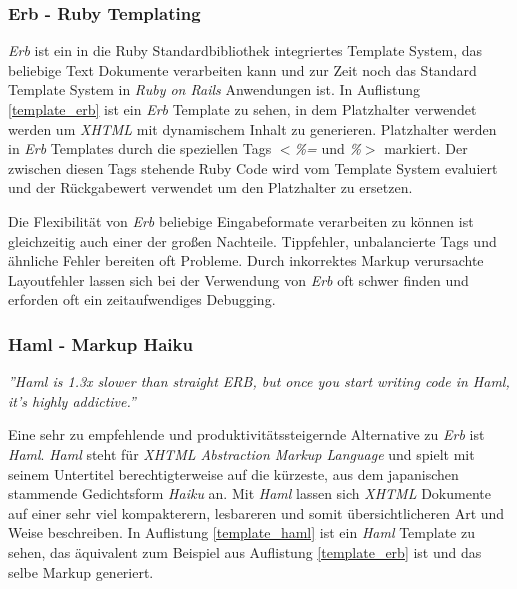 \subsubsection{Erb - Ruby Templating}

\textit{Erb} ist ein in die Ruby Standardbibliothek integriertes
Template System, das beliebige Text Dokumente verarbeiten kann und zur
Zeit noch das Standard Template System in \textit{Ruby on Rails}
Anwendungen ist. In Auflistung \ref{template_erb} ist ein \textit{Erb}
Template zu sehen, in dem Platzhalter verwendet werden um
\textit{XHTML}  mit dynamischem Inhalt zu generieren. Platzhalter werden
in \textit{Erb} Templates durch die speziellen Tags \textit{$<$\%=} und
\textit{\%$>$} markiert. Der zwischen diesen Tags stehende Ruby Code
wird vom Template System evaluiert und der Rückgabe\-wert verwendet um
den Platzhalter zu ersetzen.



Die Flexibilität von \textit{Erb} beliebige Eingabeformate verarbeiten zu
können ist gleichzeitig auch einer der großen Nachteile. Tippfehler,
unbalancierte Tags und ähnliche Fehler bereiten oft Probleme. Durch
inkorrektes Markup verursachte Layoutfehler lassen sich bei der
Verwendung von \textit{Erb} oft schwer finden und erforden oft ein
zeitaufwendiges Debugging.

\subsubsection{Haml - Markup Haiku}

\textit{''Haml is 1.3x slower than straight ERB, but once you start
  writing code in Haml, it’s highly addictive.''}

Eine sehr zu empfehlende und produktivitätssteigernde Alternative zu
\textit{Erb} ist \textit{Haml}. \textit{Haml} steht für \textit{XHTML
  Abstraction Markup Language} und spielt mit seinem Untertitel
berechtigterweise auf die kürzeste, aus dem japanischen stammende
Gedichtsform \textit{Haiku} an. Mit \textit{Haml} lassen sich \textit{XHTML}
Dokumente auf einer sehr viel kompakterern, lesbareren und somit
übersichtlicheren Art und Weise beschreiben. In Auflistung
\ref{template_haml} ist ein \textit{Haml} Template zu sehen, das äquivalent zum
Beispiel aus Auflistung \ref{template_erb} ist und das selbe Markup
generiert.

